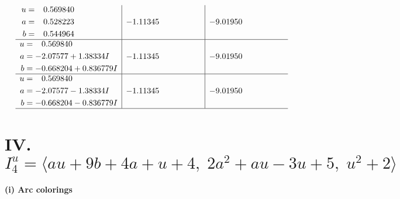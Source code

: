 \documentclass[1p]{elsarticle_modified}
\theoremstyle{definition}
\begin{document}
$$\begin{array}{c|c|c}
\begin{aligned}
u &= \phantom{-}0.569840\phantom{ +0.000000I} \\
a &= \phantom{-}0.528223\phantom{ +0.000000I} \\
b &= \phantom{-}0.544964\phantom{ +0.000000I}\end{aligned}
 & -1.11345\phantom{ +0.000000I} & -9.01950\phantom{ +0.000000I} \\ \hline\begin{aligned}
u &= \phantom{-}0.569840\phantom{ +0.000000I} \\
a &= -2.07577 + 1.38334 I \\
b &= -0.668204 + 0.836779 I\end{aligned}
 & -1.11345\phantom{ +0.000000I} & -9.01950\phantom{ +0.000000I} \\ \hline\begin{aligned}
u &= \phantom{-}0.569840\phantom{ +0.000000I} \\
a &= -2.07577 - 1.38334 I \\
b &= -0.668204 - 0.836779 I\end{aligned}
 & -1.11345\phantom{ +0.000000I} & -9.01950\phantom{ +0.000000I}\\
 \hline 
 \end{array}$$\newpage\newpage\renewcommand{\arraystretch}{1}
\centering \section*{IV. $I^u_{4}= \langle a u+9 b+4 a+u+4,\;2 a^2+a u-3 u+5,\;u^2+2 \rangle$}
\flushleft \textbf{(i) Arc colorings}\\
\end{document}
